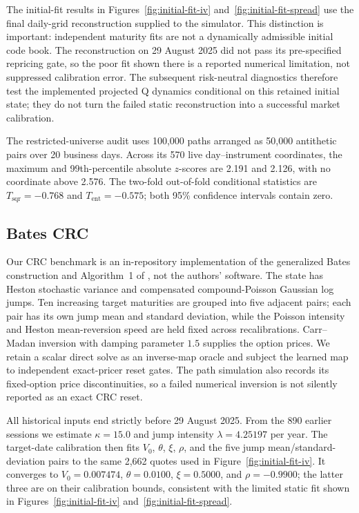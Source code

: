 The initial-fit results in Figures~\ref{fig:initial-fit-iv}
and~\ref{fig:initial-fit-spread} use the final daily-grid reconstruction
supplied to the simulator.  This distinction is important: independent
maturity fits are not a dynamically admissible initial code book.  The
reconstruction on 29 August 2025 did not pass its pre-specified repricing gate,
so the poor fit shown there is a reported numerical limitation, not suppressed
calibration error.  The
subsequent risk-neutral diagnostics therefore test the implemented projected
Q dynamics conditional on this retained initial state; they do not turn the
failed static reconstruction into a successful market calibration.

The restricted-universe audit uses 100,000 paths arranged as 50,000
antithetic pairs over 20 business days.  Across its 570 live
day--instrument coordinates, the maximum and 99th-percentile absolute
$z$-scores are 2.191 and 2.126, with no coordinate above 2.576.  The two-fold
out-of-fold conditional statistics are $T_{\mathrm{sqr}}=-0.768$ and
$T_{\mathrm{ent}}=-0.575$; both 95\% confidence intervals contain zero.

\subsection{Bates CRC}
\label{app:bates-crc}

Our CRC benchmark is an in-repository implementation of the generalized
Bates construction and Algorithm~1 of
\citet{DysLitGambaraTeichmann2021}, not the authors' software.  The state has
Heston stochastic variance and compensated compound-Poisson Gaussian log
jumps.  Ten increasing target maturities are grouped into five adjacent
pairs; each pair has its own jump mean and standard deviation, while the
Poisson intensity and Heston mean-reversion speed are held fixed across
recalibrations.  Carr--Madan inversion with damping parameter $1.5$ supplies
the option prices.  We retain a scalar direct solve as an inverse-map oracle
and subject the learned map to independent exact-pricer reset gates.  The path
simulation also records its fixed-option price discontinuities, so a failed
numerical inversion is not silently reported as an exact CRC reset.

All historical inputs end strictly before 29 August 2025.  From the 890
earlier sessions we estimate $\kappa=15.0$ and jump intensity
$\lambda=4.25197$ per year.  The target-date calibration then fits $V_0$,
$\theta$, $\xi$, $\rho$, and the five jump mean/standard-deviation pairs to
the same 2,662 quotes used in Figure~\ref{fig:initial-fit-iv}.  It converges to
$V_0=0.007474$, $\theta=0.0100$, $\xi=0.5000$, and $\rho=-0.9900$; the latter
three are on their calibration bounds, consistent with the limited static
fit shown in Figures~\ref{fig:initial-fit-iv}
and~\ref{fig:initial-fit-spread}.

